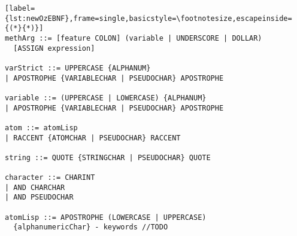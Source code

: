 \begin{lstlisting}[label={lst:newOzEBNF},frame=single,basicstyle=\footnotesize,escapeinside={(*}{*)}]
methArg ::= [feature COLON] (variable | UNDERSCORE | DOLLAR)
  [ASSIGN expression]

varStrict ::= UPPERCASE {ALPHANUM}
| APOSTROPHE {VARIABLECHAR | PSEUDOCHAR} APOSTROPHE

variable ::= (UPPERCASE | LOWERCASE) {ALPHANUM}
| APOSTROPHE {VARIABLECHAR | PSEUDOCHAR} APOSTROPHE

atom ::= atomLisp
| RACCENT {ATOMCHAR | PSEUDOCHAR} RACCENT

string ::= QUOTE {STRINGCHAR | PSEUDOCHAR} QUOTE

character ::= CHARINT
| AND CHARCHAR
| AND PSEUDOCHAR

atomLisp ::= APOSTROPHE (LOWERCASE | UPPERCASE)
  {alphanumericChar} - keywords //TODO

\end{lstlisting}
